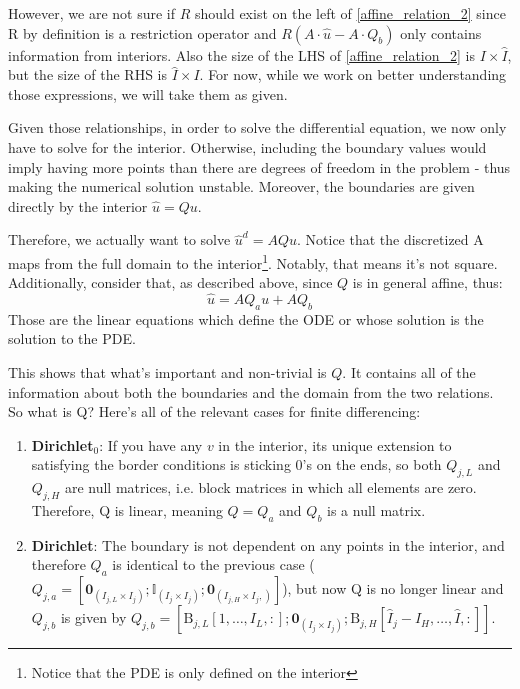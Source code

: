 \documentclass[11pt]{article}
\begin{document}
\begin{itemize}
		However, we are not sure if $R$ should exist on the left of \eqref{affine_relation_2} since R by definition is a restriction operator and $R(A\cdot \hat{u}-A\cdot Q_b)$ only contains information from interiors. Also the size of the LHS of \eqref{affine_relation_2} is $I\times \hat{I}$, but the size of the RHS is $\hat{I}\times I$.
		For now, while we work on better understanding those expressions, we will take them as given.
		
		
		Given those relationships, in order to solve the differential equation, we now only have to solve for the interior. Otherwise, including the boundary values would imply having more points than there are degrees of freedom in the problem - thus making the numerical solution unstable. Moreover, the boundaries are given directly by the interior $\hat{u} = Qu$. 
		
		Therefore, we actually want to solve $\hat{u}^d = AQu$. Notice that the discretized A maps from the full domain to the interior\footnote{Notice that the PDE is only defined on the interior}. Notably, that means it's not square. Additionally, consider that, as described above, since $Q$ is in general affine, thus:
		\begin{equation}
		\hat{u} = AQ_au + AQ_b
		\end{equation}
	Those are the linear equations which define the ODE or whose solution is the solution to the PDE.
		
	This shows that what's important and non-trivial is $Q$. It contains all of the information about both the boundaries and the domain from the two relations. So what is Q? Here's all of the relevant cases for finite differencing:
	\begin{enumerate}
	\item \textbf{Dirichlet$_0$}: If you have any $v$ in the interior, its unique extension to satisfying the border conditions is sticking $0$'s on the ends, so both $Q_{j,L}$ and $Q_{j,H}$ are null matrices, i.e. block matrices in which all elements are zero. Therefore, Q is linear, meaning $Q = Q_a$ and $Q_b$ is a null matrix.
			
	\item \textbf{Dirichlet}: The boundary is not dependent on any points in the interior, and therefore $Q_a$ is identical to the previous case ($Q_{j,a} = [\textbf{0}_{(I_{j,L} \times I_j)}; \mathbb{I}_{(I_j \times I_j)} ; \textbf{0}_{(I_{j,H} \times I_j,)} ]$), but now Q is no longer linear and
	 $Q_{j,b}$ is given by 
	 $Q_{j,b} = [\text{B}_{j,L}[1,\dots,I_L,:]; \textbf{0}_{(I_j\times I_j)};
	\text{B}_{j,H}[\hat{I}_j - I_H,\dots,\hat{I},:]]$.
			

\end{enumerate}
\end{itemize}
\end{document}

